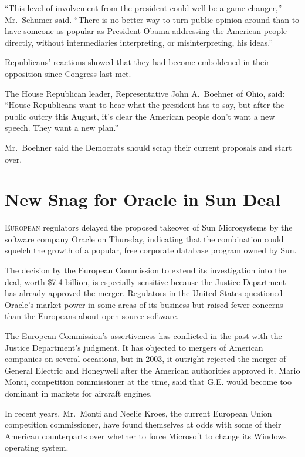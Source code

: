 ﻿\documentclass[12pt]{article}
\begin{document}
``This level of involvement from the president could well be a game-changer,'' Mr.~Schumer said.
``There is no better way to turn public opinion around than to have someone as popular as President
Obama addressing the American people directly, without intermediaries interpreting, or
misinterpreting, his ideas.''

Republicans' reactions showed that they had become emboldened in their opposition since Congress
last met.

The House Republican leader, Representative John A.~Boehner of Ohio, said: ``House Republicans want
to hear what the president has to say, but after the public outcry this August, it's clear the
American people don't want a new speech. They want a new plan.''

Mr.~Boehner said the Democrats should scrap their current proposals and start over.

\section{New Snag for Oracle in Sun Deal}

\lettrine{E}{uropean} regulators delayed the proposed takeover of Sun Microsystems by the software
company Oracle on Thursday, indicating that the combination could squelch\cite{squelch} the growth
of a popular, free corporate database program owned by Sun.

The decision by the European Commission to extend its investigation into the deal, worth \$7.4
billion, is especially sensitive because the Justice Department has already approved the merger.
Regulators in the United States questioned Oracle's market power in some areas of its business but
raised fewer concerns than the Europeans about open-source software.

The European Commission's assertiveness has conflicted in the past with the Justice Department's
judgment. It has objected to mergers of American companies on several occasions, but in 2003, it
outright rejected the merger of General Electric and Honeywell after the American authorities
approved it. Mario Monti, competition commissioner at the time, said that G.E. would become too
dominant in markets for aircraft engines.

In recent years, Mr.~Monti and Neelie Kroes, the current European Union competition commissioner,
have found themselves at odds with some of their American counterparts over whether to force
Microsoft to change its Windows operating system.
\end{document}
